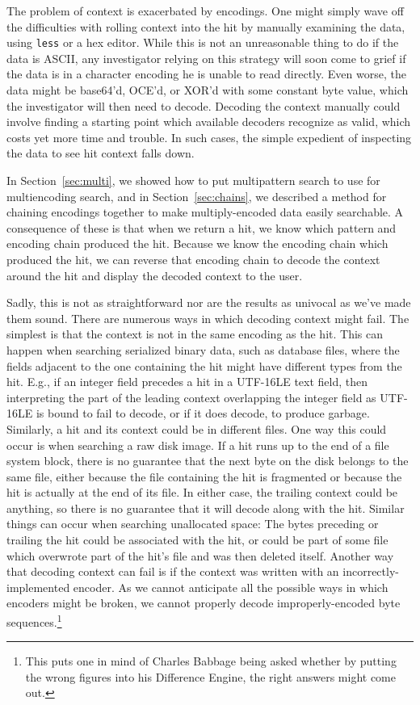\documentclass[5p,final,number,sort&compress]{elsarticle}
\begin{document}
The problem of context is exacerbated by encodings. One might simply wave off the difficulties with rolling context into the hit by manually examining the data, using \texttt{less} or a hex editor. While this is not an unreasonable thing to do if the data is ASCII, any investigator relying on this strategy will soon come to grief if the data is in a character encoding he is unable to read directly. Even worse, the data might be base64'd, OCE'd, or XOR'd with some constant byte value, which the investigator will then need to decode. Decoding the context manually could involve finding a starting point which available decoders recognize as valid, which costs yet more time and trouble. In such cases, the simple expedient of inspecting the data to see hit context falls down.

In Section~\ref{sec:multi}, we showed how to put multipattern search to use for multiencoding search, and in Section~\ref{sec:chains}, we described a method for chaining encodings together to make multiply-encoded data easily searchable. A consequence of these is that when we return a hit, we know which pattern and encoding chain produced the hit. Because we know the encoding chain which produced the hit, we can reverse that encoding chain to decode the context around the hit and display the decoded context to the user.

Sadly, this is not as straightforward nor are the results as univocal as we've made them sound. There are numerous ways in which decoding context might fail. The simplest is that the context is not in the same encoding as the hit. This can happen when searching serialized binary data, such as database files, where the fields adjacent to the one containing the hit might have different types from the hit. E.g., if an integer field precedes a hit in a UTF-16LE text field, then interpreting the part of the leading context overlapping the integer field as UTF-16LE is bound to fail to decode, or if it does decode, to produce garbage. Similarly, a hit and its context could be in different files. One way this could occur is when searching a raw disk image. If a hit runs up to the end of a file system block, there is no guarantee that the next byte on the disk belongs to the same file, either because the file containing the hit is fragmented or because the hit is actually at the end of its file. In either case, the trailing context could be anything, so there is no guarantee that it will decode along with the hit. Similar things can occur when searching unallocated space: The bytes preceding or trailing the hit could be associated with the hit, or could be part of some file which overwrote part of the hit's file and was then deleted itself. Another way that decoding context can fail is if the context was written with an incorrectly-implemented encoder. As we cannot anticipate all the possible ways in which encoders might be broken, we cannot properly decode improperly-encoded byte sequences.\footnote{This puts one in mind of Charles Babbage being asked whether by putting the wrong figures into his Difference Engine, the right answers might come out.}
\end{document}

